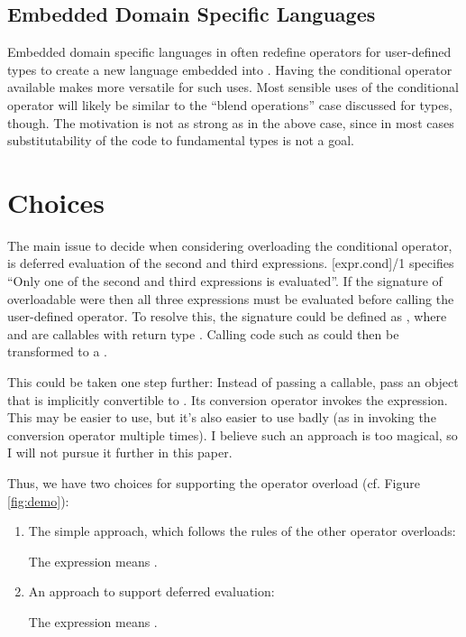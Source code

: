 \subsection{Embedded Domain Specific Languages}
Embedded domain specific languages in \CC{} often redefine operators for user-defined types to create a new language embedded into \CC{}.
Having the conditional operator available makes \CC{} more versatile for such uses.
Most sensible uses of the conditional operator will likely be similar to the “blend operations” case discussed for  types, though.
The motivation is not as strong as in the above case, since in most cases substitutability of the code to fundamental types is not a goal.

\section{Choices}
The main issue to decide when considering overloading the conditional operator, is deferred evaluation of the second and third expressions.
[expr.cond]/1 specifies “Only one of the second and third expressions is evaluated”.
If the signature of overloadable  were  then all three expressions must be evaluated before calling the user-defined operator.
To resolve this, the signature could be defined as , where  and  are callables with return type .
Calling code such as  could then be transformed to a .

This could be taken one step further:
Instead of passing a callable, pass an object that is implicitly convertible to .
Its conversion operator invokes the expression.
This may be easier to use, but it's also easier to use badly (as in invoking the conversion operator multiple times).
I believe such an approach is too magical, so I will not pursue it further in this paper.

Thus, we have two choices for supporting the operator overload (cf. Figure \ref{fig:demo}):
\begin{enumerate}
  \item\label{simple} The simple approach, which follows the rules of the other operator overloads:\\

    The expression  means .

  \item\label{deferred} An approach to support deferred evaluation:\\

    The expression  means .

\end{enumerate}

